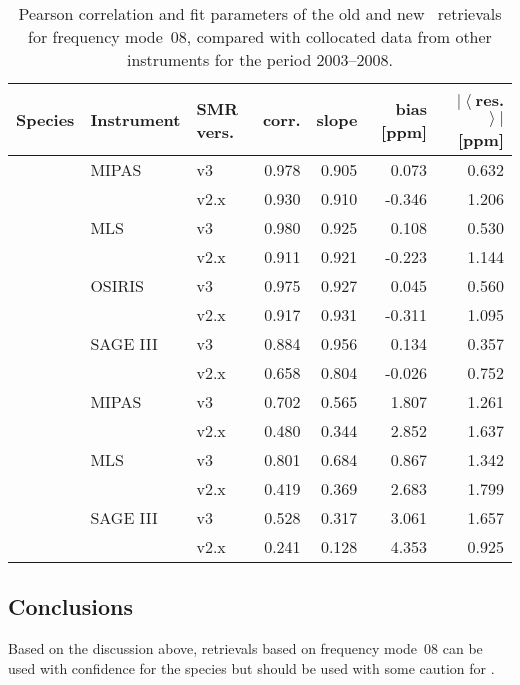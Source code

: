 \begin{table}[hbt]
\centering
\caption{Pearson correlation and fit parameters of the old and new \smr\
retrievals for frequency mode~08, compared with collocated data from other
instruments for the period 2003--2008.
}
\label{tab:fm08:stats}
\begin{tabular}{lllrrrr}
    \toprule
    \textbf{Species} & \textbf{Instrument} & \textbf{SMR vers.} & \textbf{corr.} & \textbf{slope} & \textbf{bias [ppm]} & \textbf{$\left|\left<\right.\right.$res.$\left.\left.\right>\right|$ [ppm]} \\
    \midrule
    \chem{O3}   & MIPAS     & v3    & 0.978 & 0.905 & 0.073     & 0.632 \\
                &           & v2.x  & 0.930 & 0.910 & -0.346    & 1.206 \\
    \cline{2-7}
                & MLS       & v3    & 0.980 & 0.925 & 0.108     & 0.530 \\
                &           & v2.x  & 0.911 & 0.921 & -0.223    & 1.144 \\
    \cline{2-7}
                & OSIRIS    & v3    & 0.975 & 0.927 & 0.045     & 0.560 \\
                &           & v2.x  & 0.917 & 0.931 & -0.311    & 1.095 \\
    \cline{2-7}
                & SAGE III  & v3    & 0.884 & 0.956 & 0.134     & 0.357 \\
                &           & v2.x  & 0.658 & 0.804 & -0.026    & 0.752 \\
    \midrule
    \chem{H_2O} & MIPAS     & v3    & 0.702 & 0.565 & 1.807     & 1.261 \\
                &           & v2.x  & 0.480 & 0.344 & 2.852     & 1.637 \\
    \cline{2-7}
                & MLS       & v3    & 0.801 & 0.684 & 0.867     & 1.342 \\
                &           & v2.x  & 0.419 & 0.369 & 2.683     & 1.799 \\
    \cline{2-7}
                & SAGE III  & v3    & 0.528 & 0.317 & 3.061     & 1.657 \\
                &           & v2.x  & 0.241 & 0.128 & 4.353     & 0.925 \\
    \bottomrule
\end{tabular}
\end{table}

\subsection{Conclusions}
\label{sec:fm08:conclusions}
Based on the discussion above, retrievals based on frequency mode~08 can be
used with confidence for the species \chem{O_3} but should be used with some
caution for \chem{H_2O}.

